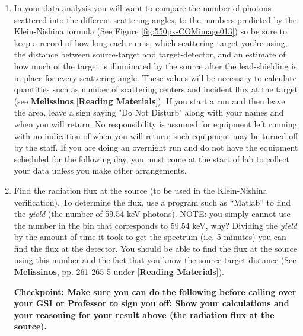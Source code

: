 \documentclass{../lab}
\begin{document}
\begin{enumerate}
\begin{itemize}
    \end{itemize}

    \item In your data analysis you will want to compare the number of photons scattered into the different scattering angles, to the numbers predicted by the Klein-Nishina formula (See Figure \ref{fig:550px-COMimage013}) so be sure to keep a record of how long each run is, which scattering target you're using, the distance between source-target and target-detector, and an estimate of how much of the target is illuminated by the source after the lead-shielding is in place for every scattering angle. These values will be necessary to calculate quantities such as number of scattering centers and incident flux at the target (see \href{http://physics111.lib.berkeley.edu/Physics111/Reprints/COM/Melissinos\%201966\%20pg\%20252-265\%20and\%20369-384.pdf}{\textbf{Melissinos}} [\href{http://physics111.lib.berkeley.edu/Physics111/Reprints/COM/COM\_index.html}{\textbf{Reading Materials}}]). If you start a run and then leave the area, leave a sign saying "Do Not Disturb" along with your names and when you will return. No responsibility is assumed for equipment left running with no indication of when you will return; such equipment may be turned off by the staff. If you are doing an overnight run and do not have the equipment scheduled for the following day, you must come at the start of lab to collect your data unless you make other arrangements.

    \item Find the radiation flux at the source (to be used in the Klein-Nishina verification). To determine the flux, use a program such as ``Matlab'' to find the \emph{yield} (the number of 59.54 keV photons). NOTE: you simply cannot use the number in the bin that corresponds to 59.54 keV, why? Dividing the \emph{yield} by the amount of time it took to get the spectrum (i.e. 5 minutes) you can find the flux at the detector. You should be able to find the flux at the source using this number and the fact that you know the source target distance (See \href{http://physics111.lib.berkeley.edu/Physics111/Reprints/COM/Melissinos\%201966\%20pg\%20252-265\%20and\%20369-384.pdf}{\textbf{Melissinos}}, pp. 261-265 5 under [\href{http://physics111.lib.berkeley.edu/Physics111/Reprints/COM/COM\_index.html}{\textbf{Reading Materials}}]). 
    
    \textbf{Checkpoint: Make sure you can do the following before calling over your GSI or Professor to sign you off:
	Show your calculations and your reasoning for your result above (the radiation flux at the source).}


\end{enumerate}
\end{document}
